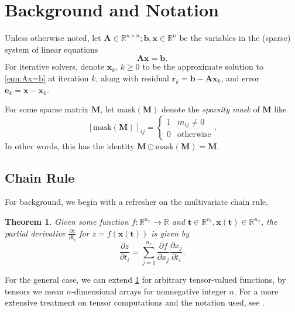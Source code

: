 \documentclass{article}
\newcommand{\mat}[1]{\bm{{#1}}}
\renewcommand{\vec}[1]{\bm{{#1}}}
\newcommand{\mask}[1]{\text{mask}\left( {#1} \right)}
\newtheorem{theorem}{Theorem}[section]
\theoremstyle{definition}
\begin{document}
\section{Background and Notation}
Unless otherwise noted, let $\mat{A} \in \mathbb{R}^{n \times n}; \vec{b}, \vec{x} \in \mathbb{R}^n$ be the variables in the (sparse) system of linear equations
\begin{equation}
  \mat{A}\vec{x} = \vec{b}. \label{eqn:Ax=b}
\end{equation}
For iterative solvers, denote $\vec{x}_k$, $k \geq 0$ to be the approximate solution to \cref{eqn:Ax=b} at iteration $k$, along with residual $\vec{r}_k = \vec{b} - \mat{A}\vec{x}_k$, and error $\vec{e}_k = \vec{x} - \vec{x}_k$.

For some sparse matrix $\mat{M}$, let $\mask{\mat{M}}$ denote the \textit{sparsity mask} of $\mat{M}$ like
\begin{equation}
  \left[\mask{\mat{M}}\right]_{ij} = \begin{cases}
    1 & m_{ij} \neq 0 \\
    0 & \text{otherwise}
    \end{cases}.
\end{equation}
In other words, this has the identity $\mat{M} \odot \mask{\mat{M}} = \mat{M}$.

\subsection{Chain Rule}
For background, we begin with a refresher on the multivariate chain rule\cite{Johnson_notes},
\begin{theorem}
  Given some function $f : \mathbb{R}^{n_x} \to \mathbb{R}$ and $\vec{t} \in \mathbb{R}^{n_t}, \vec{x}\left(\vec{t}\right) \in \mathbb{R}^{n_x}$, the partial derivative $\frac{\partial z}{\partial t_i}$ for $z=f(\vec{x}\left(\vec{t}\right))$ is given by
  \begin{equation}
    \frac{\partial z}{\partial t_i} = \sum_{j=1}^{n_x} \frac{\partial f}{\partial x_j} \frac{\partial x_j}{\partial t_i}. \label{eqn:chainrule}
  \end{equation}
  \label{thm:chainrule}
\end{theorem}

For the general case, we can extend \cref{thm:chainrule} for arbitrary tensor-valued functions, by tensors we mean $n$-dimensional arrays for nonnegative integer $n$.  For a more extensive treatment on tensor computations and the notation used, see \cite{tensors}.
\end{document}
